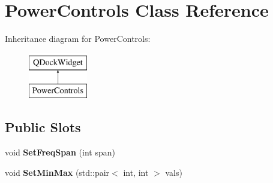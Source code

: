 \hypertarget{class_power_controls}{}\section{Power\+Controls Class Reference}
\label{class_power_controls}
Inheritance diagram for Power\+Controls\+:\begin{figure}[H]
\begin{center}
\leavevmode
\includegraphics[height=2.000000cm]{class_power_controls}
\end{center}
\end{figure}
\subsection*{Public Slots}
\begin{DoxyCompactItemize}
\item 
void {\bfseries Set\+Freq\+Span} (int span)\hypertarget{class_power_controls_a9bd193055b86e97e51d96912271fffe5}{}\label{class_power_controls_a9bd193055b86e97e51d96912271fffe5}

\item 
void {\bfseries Set\+Min\+Max} (std\+::pair$<$ int, int $>$ vals)\hypertarget{class_power_controls_afa8e34d9a376e9abc0839e3caafa6ab9}{}\label{class_power_controls_afa8e34d9a376e9abc0839e3caafa6ab9}

\end{DoxyCompactItemize}
